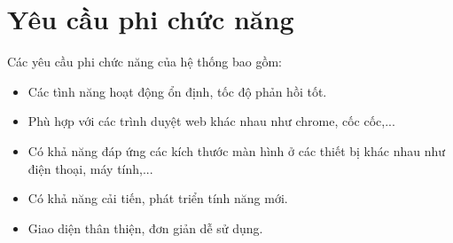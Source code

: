 \documentclass[../DoAn.tex]{subfiles}
\begin{document}
\section{Yêu cầu phi chức năng}
\label{section:2.4}
Các yêu cầu phi chức năng của hệ thống bao gồm:
\begin{itemize}
    \item Các tình năng hoạt động ổn định, tốc độ phản hồi tốt.
    \item Phù hợp với các trình duyệt web khác nhau như chrome, cốc cốc,...
    \item Có khả năng đáp ứng các kích thước màn hình ở các thiết bị khác
nhau như điện thoại, máy tính,...
    \item Có khả năng cải tiến, phát triển tính năng mới.
    \item Giao diện thân thiện, đơn giản dễ sử dụng.
\end{itemize}


\end{document}
